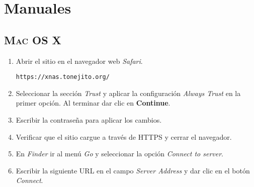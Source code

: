 {
  \linespread{1}
  \cleardoublepage  
  \appendix
  \chapter{Manuales}
  \label{apdx:a}
}


    \section {\textsc{Mac OS X}}

{
\linespread{0.1}
\begin{enumerate}


  \item Abrir el sitio en el navegador web \textsl{Safari}.

    \texttt{https://xnas.tonejito.org/}


  \item Seleccionar la secci\'{o}n \textit{Trust} y aplicar la configuraci\'{o}n \textsl{Always Trust} en la primer opci\'{o}n. Al terminar dar clic en \textbf{Continue}.


  \item Escribir la contrase\~{n}a para aplicar los cambios.


  \item Verificar que el sitio cargue a trav\'{e}s de \textsc{HTTPS} y cerrar el navegador.


  \item En \textsl{Finder} ir al men\'{u} \textsl{Go} y seleccionar la opci\'{o}n \textsl{Connect to server}.


  \item Escribir la siguiente \textsc{URL} en el campo \textsl{Server Address} y dar clic en el bot\'{o}n \textsl{Connect}.


\end{enumerate}}
